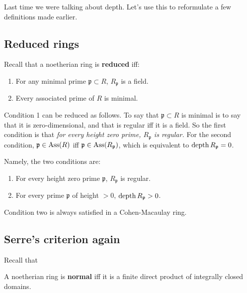 Last time we were talking about depth. Let's use this to
reformulate a few
definitions made earlier.

\subsection{Reduced rings}
Recall that a noetherian ring is \textbf{reduced} iff:
\begin{enumerate}
\item For any minimal prime $\mathfrak{p} \subset R$,
$R_{\mathfrak{p}}$ is a
field.
\item Every associated prime of $R$ is minimal.
\end{enumerate}

Condition 1 can be reduced as follows. To say that
$\mathfrak{p}\subset R$ is
minimal is to say that it is zero-dimensional, and that is
regular iff it is a
field. So the first condition is that \emph{for every height
zero prime,
$R_{\mathfrak{p}}$ is regular.} For the second condition,
$\mathfrak{p} \in
\operatorname{Ass}(R)$ iff $\mathfrak{p} \in \operatorname{Ass}(R_{\mathfrak{p}})$, which is
equivalent to
$\operatorname{depth} R_{\mathfrak{p}} = 0$.

Namely, the two conditions are:
\begin{enumerate}
\item For every height zero prime $\mathfrak{p} $,
$R_{\mathfrak{p}}$ is
regular.
\item For every prime $\mathfrak{p}$ of height $>0$, $\operatorname{depth}
R_{\mathfrak{p}} >
0$.
\end{enumerate}

Condition two is always satisfied in a Cohen-Macaulay ring.

\subsection{Serre's criterion again}

Recall that
\begin{definition}
A noetherian ring is \textbf{normal} iff it is a finite direct
product of
integrally closed domains.
\end{definition}


